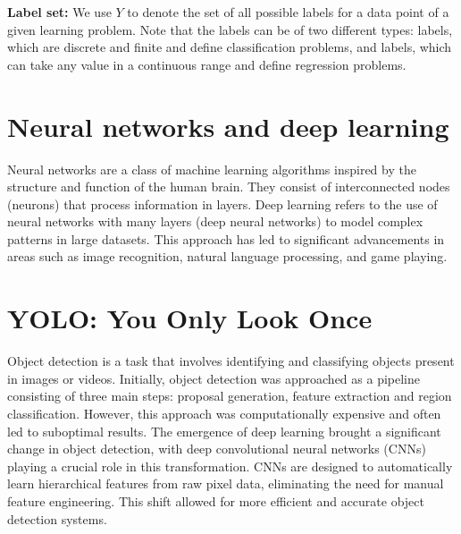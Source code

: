 \textbf{Label set: } We use \( Y \) to denote the set of all possible labels for a data point of a given learning problem. Note that the labels can be of two different types:  labels, which are discrete and finite and define classification problems, and  labels, which can take any value in a continuous range and define regression problems.

\section{Neural networks and deep learning} 
Neural networks are a class of machine learning algorithms inspired by the structure and function of the human brain. They consist of interconnected nodes (neurons) that process information in layers. Deep learning refers to the use of neural networks with many layers (deep neural networks) to model complex patterns in large datasets. This approach has led to significant advancements in areas such as image recognition, natural language processing, and game playing.

\section{YOLO: You Only Look Once}
Object detection is a task that involves identifying and classifying objects present in images or videos. Initially, object detection was approached as a pipeline consisting of three main steps: proposal generation, feature extraction and region classification. However, this approach was computationally expensive and often led to suboptimal results.
The emergence of deep learning brought a significant change in object detection, with deep convolutional neural networks (CNNs) playing a crucial role in this transformation. CNNs are designed to automatically learn hierarchical features from raw pixel data, eliminating the need for manual feature engineering. This shift allowed for more efficient and accurate object detection systems.

